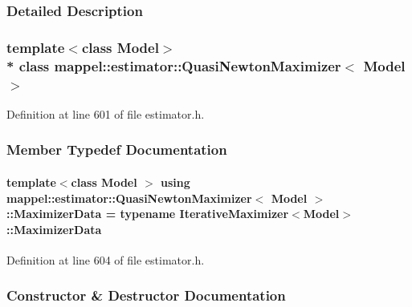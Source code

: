 \subsubsection{Detailed Description}
\subsubsection*{template$<$class Model$>$\\*
class mappel\+::estimator\+::\+Quasi\+Newton\+Maximizer$<$ Model $>$}



Definition at line 601 of file estimator.\+h.



\subsubsection{Member Typedef Documentation}
\paragraph[{\texorpdfstring{Maximizer\+Data}{MaximizerData}}]{\setlength{\rightskip}{0pt plus 5cm}template$<$class Model $>$ using {\bf mappel\+::estimator\+::\+Quasi\+Newton\+Maximizer}$<$ Model $>$\+::{\bf Maximizer\+Data} =  typename {\bf Iterative\+Maximizer}$<$Model$>$\+::{\bf Maximizer\+Data}}\hypertarget{classmappel_1_1estimator_1_1QuasiNewtonMaximizer_a715d110652534690ba16e134d45a782e}{}\label{classmappel_1_1estimator_1_1QuasiNewtonMaximizer_a715d110652534690ba16e134d45a782e}


Definition at line 604 of file estimator.\+h.



\subsubsection{Constructor \& Destructor Documentation}
